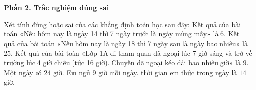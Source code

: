 \textbf{Phần 2. Trắc nghiệm đúng sai}

\begin{ex} %
Xét tính đúng hoặc sai của các khẳng định toán học sau đây:
\choiceTF
{Kết quả của bài toán «Nếu hôm nay là ngày 14 thì 7 ngày trước là ngày mùng mấy» là $6$.}
{\True Kết quả của bài toán «Nếu hôm nay là ngày 18 thì 7 ngày sau là ngày bao nhiêu» là $25$.}
{\True Kết quả của bài toán «Lớp 1A đi tham quan dã ngoại lúc 7 giờ sáng và trở về trường lúc 4 giờ chiều (tức 16 giờ). Chuyến dã ngoại kéo dài bao nhiêu giờ» là $9$.}
{Một ngày có 24 giờ. Em ngủ 9 giờ mỗi ngày. thời gian em thức trong ngày là $14$ giờ.}
\end{ex}

